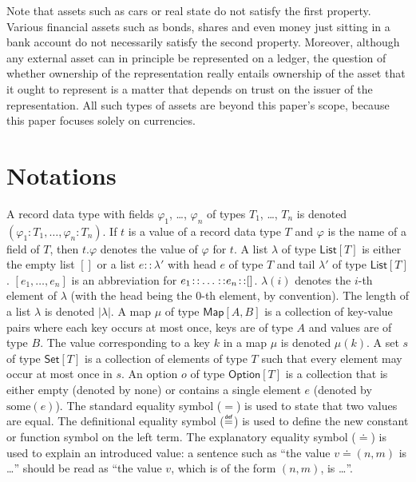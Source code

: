 \documentclass{llncs}
\newcommand{\defeq}{\mathrel{\overset{\makebox[0pt]{\mbox{\normalfont\tiny\sffamily def}}}{=}}}
\newcommand{\expeq}{\doteq}
\newcommand{\cons}{\colon\hspace{-3pt}\colon\hspace{-3pt}}
\newcommand{\append}{\colon\hspace{-3pt}\colon\hspace{-3pt}\colon\hspace{-3pt}}
\newcommand{\hash}[1]{#1^{\scriptscriptstyle\#}}
\newcommand{\nil}{[]}
\newcommand{\type}[1]{\mathsf{#1}}
\newcommand{\listT}{\type{List}}
\newcommand{\setT}{\type{Set}}
\newcommand{\mapT}{\type{Map}}
\newcommand{\maybeT}{\type{Option}}
\newcommand{\func}[1]{\mathrm{#1}}
\newcommand{\nothing}{\func{none}}
\newcommand{\just}{\func{some}}
\begin{document}
Note that assets such as cars or real state do not satisfy the first property. Various financial assets such as bonds, shares and even money just sitting in a bank account do not necessarily satisfy the second property. Moreover, although any external asset can in principle be represented on a ledger, the question of whether ownership of the representation really entails ownership of the asset that it ought to represent is a matter that depends on trust on the issuer of the representation. All such types of assets are beyond this paper's scope, because this paper focuses solely on currencies.


\section{Notations}

A record data type with fields $\varphi_1$, \ldots, $\varphi_n$ of types $T_1$, \ldots, $T_n$ is denoted $(\varphi_1\colon T_1,\ldots,\varphi_n\colon T_n)$.
If $t$ is a value of a record data type $T$ and $\varphi$ is the name of a field of $T$, then $t.\varphi$ denotes the value of $\varphi$ for $t$.
A list $\lambda$ of type $\listT[T]$ is either the empty list $\nil$ or
a list $e::\lambda'$ with head $e$ of type $T$ and tail $\lambda'$ of type $\listT[T]$. $[e_1, \ldots, e_n]$ is an abbreviation for $e_1\cons\ldots\cons e_n\cons\nil$. $\lambda(i)$ denotes the $i$-th element of $\lambda$ (with the head being the 0-th element, by convention).
The length of a list $\lambda$ is denoted $|\lambda|$.
A map $\mu$ of type $\mapT[A, B]$ is a collection of key-value pairs where each key occurs at most once, keys are of type $A$ and values are of type $B$. The value corresponding to a key $k$ in a map $\mu$ is denoted $\mu(k)$. A set $s$ of type $\setT[T]$ is a collection of elements of type $T$ such that every element may occur at most once in $s$. An option $o$ of type $\maybeT[T]$ is a collection that is either empty (denoted by $\nothing$) or contains a single element $e$ (denoted by $\just(e)$).
The standard equality symbol ($=$) is used to state that two values are equal. The definitional equality symbol ($\defeq$) is used to define the new constant or function symbol on the left term. The explanatory equality symbol ($\expeq$) is used to explain an introduced value: a sentence such as ``the value $v \expeq (n, m)$ is \ldots'' should be read as ``the value $v$, which is of the form $(n,m)$, is \ldots''.
\end{document}

